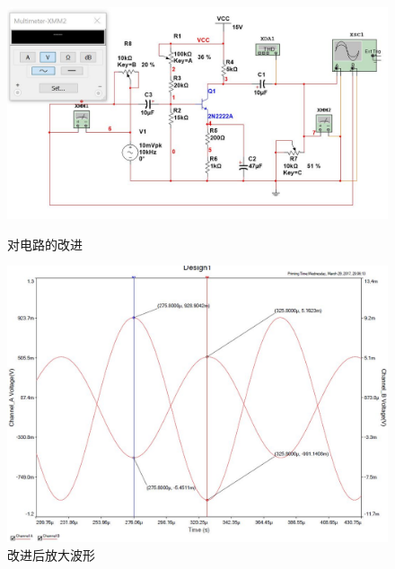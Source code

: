 \documentclass[UTF8,a4paper]{ctexart}
\begin{document}
\begin{figure}
\centering
\includegraphics[width=\textwidth]{1-3Ac.jpg}
\caption{对电路的改进}
\label{bjtc1}
\includegraphics[width=\textwidth]{1-3AA.jpg}
\caption{改进后放大波形}
\label{bjtA1}
\end{figure}
\end{document}
